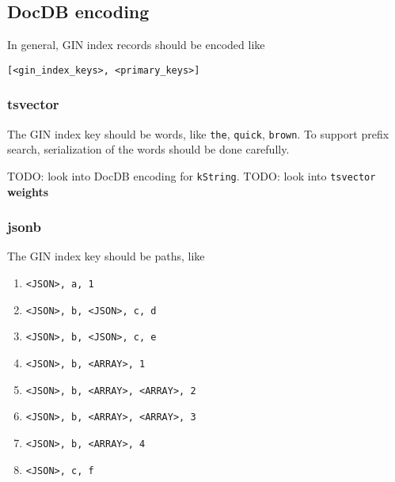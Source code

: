\documentclass[11pt]{article}
\providecommand{\tightlist}{%
  \setlength{\itemsep}{0pt}\setlength{\parskip}{0pt}}
\begin{document}
\hypertarget{docdb-encoding}{%
\subsection{DocDB encoding}\label{docdb-encoding}}

In general, GIN index records should be encoded like

\texttt{{[}\textless{}gin\_index\_keys\textgreater{},\ \textless{}primary\_keys\textgreater{}{]}}

\hypertarget{tsvector}{%
\subsubsection{tsvector}\label{tsvector}}

The GIN index key should be words, like \texttt{the}, \texttt{quick},
\texttt{brown}. To support prefix search, serialization of the words
should be done carefully.

TODO: look into DocDB encoding for \texttt{kString}. TODO: look into
\texttt{tsvector} \textbf{weights}

\hypertarget{jsonb}{%
\subsubsection{jsonb}\label{jsonb}}

The GIN index key should be paths, like

\begin{enumerate}
\def\labelenumi{\arabic{enumi}.}
\tightlist
\item
  \texttt{\textless{}JSON\textgreater{},\ a,\ 1}
\item
  \texttt{\textless{}JSON\textgreater{},\ b,\ \textless{}JSON\textgreater{},\ c,\ d}
\item
  \texttt{\textless{}JSON\textgreater{},\ b,\ \textless{}JSON\textgreater{},\ c,\ e}
\item
  \texttt{\textless{}JSON\textgreater{},\ b,\ \textless{}ARRAY\textgreater{},\ 1}
\item
  \texttt{\textless{}JSON\textgreater{},\ b,\ \textless{}ARRAY\textgreater{},\ \textless{}ARRAY\textgreater{},\ 2}
\item
  \texttt{\textless{}JSON\textgreater{},\ b,\ \textless{}ARRAY\textgreater{},\ \textless{}ARRAY\textgreater{},\ 3}
\item
  \texttt{\textless{}JSON\textgreater{},\ b,\ \textless{}ARRAY\textgreater{},\ 4}
\item
  \texttt{\textless{}JSON\textgreater{},\ c,\ f}
\end{enumerate}
\end{document}
